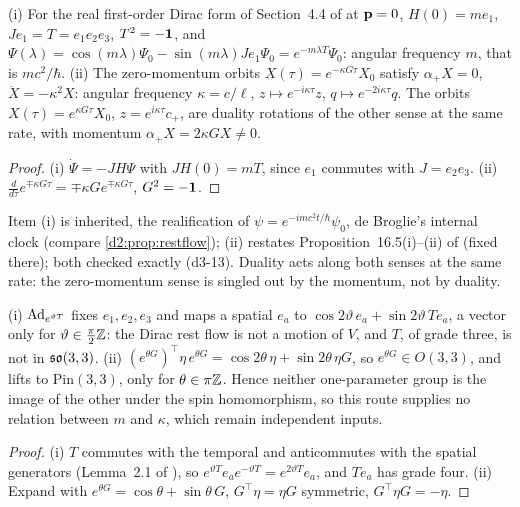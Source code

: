 \begin{proposition}
\label{d3:prop:tworot}
(i) For the real first-order Dirac form of Section~4.4 of \cite{ES17} at $\mathbf p=0$, $H(0)=me_1$, $Je_1=T=e_1e_2e_3$, $T^2=-\mathbf 1$, and
$\Psi(\lambda)=\cos(m\lambda)\Psi_0-\sin(m\lambda)Je_1\Psi_0=e^{-m\lambda T}\Psi_0$: angular frequency $m$, that is $mc^2/\hbar$. (ii) The zero-momentum
orbits $X(\tau)=e^{-\kappa G\tau}X_0$ satisfy $\alpha_+X=0$, $\ddot X=-\kappa^2X$: angular frequency $\kappa=c/\ell$, $z\mapsto e^{-i\kappa\tau}z$,
$q\mapsto e^{-2i\kappa\tau}q$. The orbits $X(\tau)=e^{\kappa G\tau}X_0$, $z=e^{i\kappa\tau}c_+$, are duality rotations of the other sense at the same rate,
with momentum $\alpha_+X=2\kappa GX\neq0$.
\end{proposition}

\begin{proof}
(i) $\dot\Psi=-JH\Psi$ with $JH(0)=mT$, since $e_1$ commutes with $J=e_2e_3$. (ii) $\tfrac{d}{d\tau}e^{\mp\kappa G\tau}=\mp\kappa Ge^{\mp\kappa G\tau}$,
$G^2=-\mathbf 1$.
\end{proof}

Item (i) is inherited, the realification of $\psi=e^{-imc^2t/\hbar}\psi_0$, de Broglie's internal clock \cite{deBroglie1925} (compare
\cref{d2:prop:restflow}); (ii) restates Proposition~16.5(i)--(ii) of \cite{ES17} (fixed there); both checked exactly (d3-13). Duality acts along both
senses at the same rate: the zero-momentum sense is singled out by the momentum, not by duality.

\begin{proposition}
\label{d3:prop:norel}
(i) $\operatorname{Ad}_{e^{\vartheta T}}$ fixes $e_1,e_2,e_3$ and maps a spatial $e_a$ to $\cos2\vartheta\,e_a+\sin2\vartheta\,Te_a$, a vector only for
$\vartheta\in\tfrac\pi2\mathbb{Z}$: the Dirac rest flow is not a motion of $V$, and $T$, of grade three, is not in $\mathfrak{so}(3,3)$. (ii)
$(e^{\theta G})^{\!\top}\eta\,e^{\theta G}=\cos2\theta\,\eta+\sin2\theta\,\eta G$, so $e^{\theta G}\in O(3,3)$, and lifts to $\mathrm{Pin}(3,3)$, only for
$\theta\in\pi\mathbb{Z}$. Hence neither one-parameter group is the image of the other under the spin homomorphism, so this route supplies no relation
between $m$ and $\kappa$, which remain independent inputs.
\end{proposition}

\begin{proof}
(i) $T$ commutes with the temporal and anticommutes with the spatial generators (Lemma~2.1 of \cite{ES17}), so
$e^{\vartheta T}e_ae^{-\vartheta T}=e^{2\vartheta T}e_a$, and $Te_a$ has grade four. (ii) Expand with $e^{\theta G}=\cos\theta+\sin\theta\,G$,
$G^{\!\top}\eta=\eta G$ symmetric, $G^{\!\top}\eta G=-\eta$.
\end{proof}


